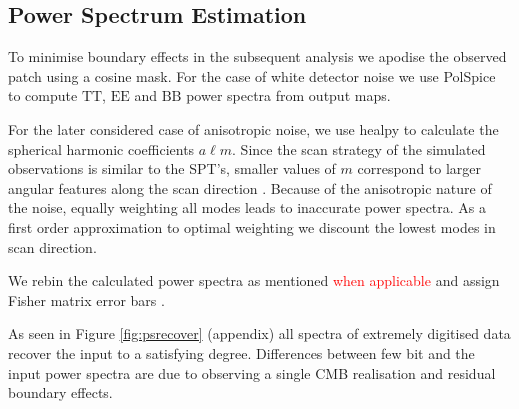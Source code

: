 \documentclass[apj]{emulateapj}
\newcommand{\changed}[1]{\textcolor{Red}{#1}}
\begin{document}




\subsection{Power Spectrum Estimation}
\label{subsec:psestimation}

To minimise boundary effects in the subsequent analysis we apodise the observed patch using a cosine mask. For the case of white detector noise we use PolSpice \citep{polspice} to compute $\mathrm{TT}$, $\mathrm{EE}$ and $\mathrm{BB}$ power spectra from output maps. 

For the later considered case of anisotropic noise, we use healpy to calculate the spherical harmonic coefficients $a\ell m$. Since the scan strategy of the simulated observations is similar to the SPT's, smaller values of $m$ correspond to larger angular features along the scan direction \citep{chown2018}. Because of the anisotropic nature of the noise, equally weighting all modes leads to inaccurate power spectra. As a first order approximation to optimal weighting we discount the lowest modes in scan direction.

We rebin the calculated power spectra as mentioned \changed{when applicable} and assign Fisher matrix error bars \citep{tegmarkdesignersguide1997}.

As seen in Figure \ref{fig:psrecover} (appendix) all spectra of extremely digitised data recover the input to a satisfying degree. Differences between few bit and the input power spectra are due to observing a single CMB realisation and residual boundary effects.
\end{document}
